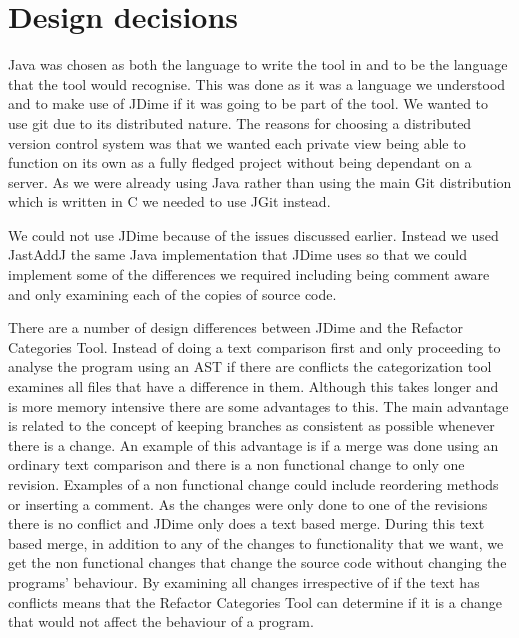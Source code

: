 
\section{Design decisions}
Java was chosen as both the language to write the tool in and to be the language that the tool would recognise.  This was done as it was a language we understood and to make use of JDime if it was going to be part of the tool.  We wanted to use git due to its distributed nature.  The reasons for choosing a distributed version control system was that we wanted each private view being able to function on its own as a fully fledged project without being dependant on a server.  As we were already using Java rather than using the main Git distribution which is written in C we needed to use JGit instead.

We could not use JDime because of the issues discussed earlier. Instead we used JastAddJ the same Java implementation that JDime uses so that we could implement some of the differences we required including being comment aware and only examining each of the copies of source code.

There are a number of design differences between JDime and the Refactor Categories Tool.  Instead of doing a text comparison first and only proceeding to analyse the program using an AST if there are conflicts the categorization tool examines all files that have a difference in them.  Although this takes longer and is more memory intensive there are some advantages to this. The main advantage is related to the concept of keeping branches as consistent as possible whenever there is a change. An example of this advantage is if a merge was done using an ordinary text comparison and there is a non functional change to only one revision. Examples of a non functional change could include reordering methods or inserting a comment.  As the changes were only done to one of the revisions there is no conflict and JDime only does a text based merge.  During this text based merge, in addition to any of the changes to functionality that we want, we get the non functional changes that change the source code without changing the programs' behaviour. By examining all changes irrespective of if the text has conflicts means that the Refactor Categories Tool can determine if it is a change that would not affect the behaviour of a program.

